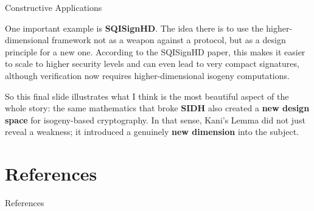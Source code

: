 \documentclass[aspectratio=169,notheorems]{beamer}
\begin{document}
\begin{frame}{Constructive Applications}
{			One important example is \textbf{SQISignHD}. The idea there is to use the higher-dimensional framework not as a weapon against a protocol, but as a design principle for a new one. According to the SQISignHD paper, this makes it easier to scale to higher security levels and can even lead to very compact signatures, although verification now requires higher-dimensional isogeny computations.
			
			So this final slide illustrates what I think is the most beautiful aspect of the whole story: the same mathematics that broke \textbf{SIDH} also created a \textbf{new design space} for isogeny-based cryptography. In that sense, Kani's Lemma did not just reveal a weakness; it introduced a genuinely \textbf{new dimension} into the subject.
		}
	\end{frame}
%	
	

	
	\section{References}
	

	
	\begin{frame}[allowframebreaks]{References}
		\printbibliography[heading=none]
	\end{frame}
	
	
	
	\appendix
	

	
	\mcmEndFrame
\end{document}
